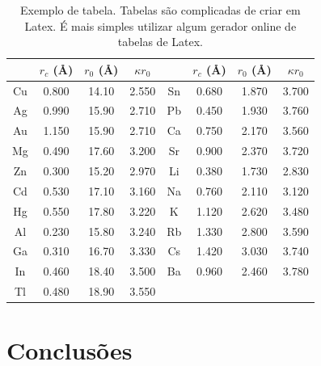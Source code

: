 \documentclass[%
 reprint,
 amsmath,amssymb,
 aps,
]{revtex4-2}
\begin{document}
\begin{table}[b]
\caption{\label{tab:table2}
Exemplo de tabela. Tabelas são complicadas de criar em Latex. É mais simples utilizar algum gerador online de tabelas de Latex.}
\begin{ruledtabular}
\begin{tabular}{cccccccc}
 &$r_c$ (\AA)&$r_0$ (\AA)&$\kappa r_0$&
 &$r_c$ (\AA) &$r_0$ (\AA)&$\kappa r_0$\\
\hline
Cu& 0.800 & 14.10 & 2.550 &Sn
& 0.680 & 1.870 & 3.700 \\
Ag& 0.990 & 15.90 & 2.710 &Pb
& 0.450 & 1.930 & 3.760 \\
Au& 1.150 & 15.90 & 2.710 &Ca
& 0.750 & 2.170 & 3.560 \\
Mg& 0.490 & 17.60 & 3.200 &Sr
& 0.900 & 2.370 & 3.720 \\
Zn& 0.300 & 15.20 & 2.970 &Li
& 0.380 & 1.730 & 2.830 \\
Cd& 0.530 & 17.10 & 3.160 &Na
& 0.760 & 2.110 & 3.120 \\
Hg& 0.550 & 17.80 & 3.220 &K
&  1.120 & 2.620 & 3.480 \\
Al& 0.230 & 15.80 & 3.240 &Rb
& 1.330 & 2.800 & 3.590 \\
Ga& 0.310 & 16.70 & 3.330 &Cs
& 1.420 & 3.030 & 3.740 \\
In& 0.460 & 18.40 & 3.500 &Ba
& 0.960 & 2.460 & 3.780 \\
Tl& 0.480 & 18.90 & 3.550 & & & & \\
\end{tabular}
\end{ruledtabular}
\end{table}

\section{Conclusões}

\end{document}
